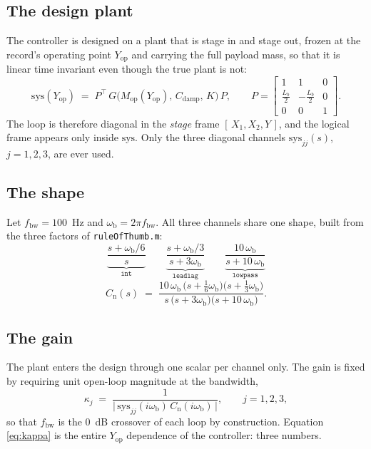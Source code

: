 \documentclass[11pt]{article}
\newcommand{\Cnorm}{C_{\mathrm{n}}}
\newcommand{\wb}{\omega_{\mathrm{b}}}
\newcommand{\Yop}{Y_{\mathrm{op}}}
\begin{document}
\subsection{The design plant}

The controller is designed on a plant that is stage in and stage out, frozen at the record's
operating point $\Yop$ and carrying the full payload mass, so that it is linear time invariant
even though the true plant is not:
\begin{equation}
  \mathrm{sys}(\Yop) \;=\; P^{\top}\,
  G\bigl(M_{\mathrm{op}}(\Yop),\, C_{\mathrm{damp}},\, K\bigr)\, P ,
  \qquad
  P =
  \begin{bmatrix}
    1 & 1 & 0 \\[1mm]
    \tfrac{L_b}{2} & -\tfrac{L_b}{2} & 0 \\[1mm]
    0 & 0 & 1
  \end{bmatrix} .
  \label{eq:sys}
\end{equation}
The loop is therefore diagonal in the \emph{stage} frame $[\,X_1, X_2, Y\,]$, and the logical
frame appears only inside $\mathrm{sys}$. Only the three diagonal channels
$\mathrm{sys}_{jj}(s)$, $j = 1,2,3$, are ever used.

\subsection{The shape}

Let $f_{\mathrm{bw}} = 100$~Hz and $\wb = 2\pi f_{\mathrm{bw}}$. All three channels share one
shape, built from the three factors of \texttt{ruleOfThumb.m}:
\begin{equation}
  \underbrace{\frac{s+\wb/6}{s}}_{\texttt{int}}
  \qquad
  \underbrace{\frac{s+\wb/3}{s+3\wb}}_{\texttt{leadlag}}
  \qquad
  \underbrace{\frac{10\,\wb}{s+10\,\wb}}_{\texttt{lowpass}}
  \label{eq:factors}
\end{equation}
\begin{equation}
  \Cnorm(s)
  \;=\;
  \frac{10\,\wb\,\bigl(s+\tfrac{1}{6}\wb\bigr)\bigl(s+\tfrac{1}{3}\wb\bigr)}
       {s\,\bigl(s+3\wb\bigr)\bigl(s+10\,\wb\bigr)} .
  \label{eq:cnorm}
\end{equation}

\subsection{The gain}

The plant enters the design through one scalar per channel only. The gain is fixed by requiring
unit open-loop magnitude at the bandwidth,
\begin{equation}
  \kappa_j \;=\; \frac{1}{\bigl|\,\mathrm{sys}_{jj}(i\wb)\,\Cnorm(i\wb)\,\bigr|} ,
  \qquad j = 1,2,3 ,
  \label{eq:kappa}
\end{equation}
so that $f_{\mathrm{bw}}$ is the $0$~dB crossover of each loop by construction. Equation
\eqref{eq:kappa} is the entire $\Yop$ dependence of the controller: three numbers.
\end{document}
